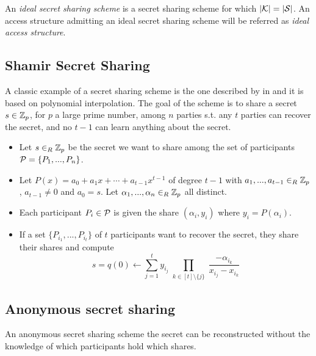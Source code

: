  An \textit{ideal secret sharing scheme} is a secret sharing scheme for which $\vert \mathcal{K} \vert = \vert \mathcal{S} \vert$. An access structure admitting an ideal secret sharing scheme will be referred as \textit{ideal access structure}.


\subsection{Shamir Secret Sharing}
A classic example of a secret sharing scheme is the one described by \citeauthor{Sham79} in \cite{Sham79} and it is based on polynomial interpolation. The goal of the scheme is to share a secret $s \in {\mathbb Z}_p$, for $p$ a large prime number, among $n$ parties s.t. any $t$ parties can recover the secret, and no $t-1$ can learn anything about the secret.

\begin{itemize}[align = left, leftmargin=*, label={--}]
\item Let $s \in_R {\mathbb Z}_p$ be the secret we want to share among the set of participants ${\mathcal P} = \{P_1, ... , P_n \}$.
\item Let $P(x) = a_0 + a_1 x + \cdots + a_{t-1} x^{t-1}$ of degree $t-1$ with $a_1, ..., a_{t-1} \in_R {\mathbb Z}_p$, $a_{t-1} \neq 0$ and $a_0 = s$. Let $\alpha_1, ... , \alpha_n \in_R {\mathbb Z}_p$ all distinct.
\item Each participant $P_i \in {\mathcal P}$ is given the share $(\alpha_i, y_i)$ where $y_i = P(\alpha_i)$.
\item If a set $\{P_{i_1},...,P_{i_t}\}$ of $t$ participants want to recover the secret, they share their shares and compute
$$ s = q(0) \leftarrow \sum_{j=1}^t y_{i_j} \prod_{\substack{k \in [t] \setminus \{j\}}} \frac{-\alpha_{i_k}}{x_{i_j}-x_{i_k}}$$
\end{itemize}

\subsection{Anonymous secret sharing}
An anonymous secret sharing scheme the secret can be reconstructed without the knowledge of which participants hold which shares.

